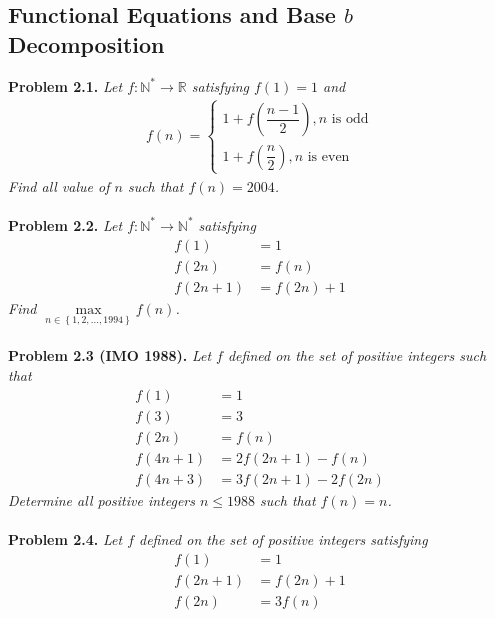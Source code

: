 \documentclass[a4paper,oneside]{article}
\numberwithin{equation}{section}
\begin{document}
\subsection{Functional Equations and Base $b$ Decomposition}
\textbf{Problem 2.1.} \textit{Let $f: \mathbb{N}^* \to \mathbb{R}$ satisfying $f\left(1\right) =1$ and}
\begin{align}
f\left( n \right) = \left\{ {\begin{array}{*{20}{c}}
{1 + f\left( {\dfrac{{n - 1}}{2}} \right),n\mbox{ is odd}}\\
{1 + f\left( {\dfrac{n}{2}} \right),n\mbox{ is even}}
\end{array}} \right.
\end{align}
\textit{Find all value of $n$ such that $f\left(n\right) =2004$.}\\
\\
\textbf{Problem 2.2.} \textit{Let $f:\mathbb{N}^* \to \mathbb{N}^*$ satisfying}
\begin{align}
f\left( 1 \right) &= 1\\
f\left( {2n} \right) &= f\left( n \right)\\
f\left( {2n + 1} \right) &= f\left( {2n} \right) + 1
\end{align}
\textit{Find $\mathop {\max }\limits_{n \in \left\{ {1,2, \ldots ,1994} \right\}} f\left( n \right)$.}\\
\\
\textbf{Problem 2.3 (IMO 1988).} \textit{Let $f$ defined on the set of positive integers such that}
\begin{align}
f\left( 1 \right) &= 1\\
f\left( 3 \right) &= 3\\
f\left( {2n} \right) &= f\left( n \right)\\
f\left( {4n + 1} \right) &= 2f\left( {2n + 1} \right) - f\left( n \right)\\
f\left( {4n + 3} \right) &= 3f\left( {2n + 1} \right) - 2f\left( {2n} \right)
\end{align}
\textit{Determine all positive integers $n \le 1988$ such that $f\left(n\right)=n$.}\\
\\
\textbf{Problem 2.4.} \textit{Let $f$ defined on the set of positive integers satisfying}
\begin{align}
f\left( 1 \right) &= 1\\
f\left( {2n + 1} \right) &= f\left( {2n} \right) + 1\\
f\left( {2n} \right) &= 3f\left( n \right)
\end{align}
\end{document}

